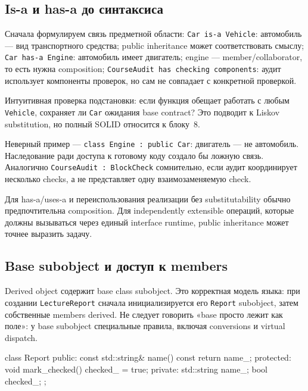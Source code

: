 \subsection{Is-a и has-a до синтаксиса}

Сначала формулируем связь предметной области:
\texttt{Car is-a Vehicle}: автомобиль --- вид транспортного средства; public inheritance может соответствовать смыслу; \texttt{Car has-a Engine}: автомобиль имеет двигатель; engine --- member/collaborator, то есть нужна composition; \texttt{CourseAudit has checking components}: аудит использует компоненты проверок, но сам не совпадает с конкретной проверкой.

Интуитивная проверка подстановки: если функция обещает работать с любым
\texttt{Vehicle}, сохраняет ли \texttt{Car} ожидания base contract? Это
подводит к Liskov substitution, но полный SOLID относится к блоку~8.

Неверный пример --- \texttt{class Engine : public Car}: двигатель --- не автомобиль. Наследование ради доступа к готовому коду создало бы ложную
связь. Аналогично \texttt{CourseAudit : BlockCheck} сомнительно, если аудит
координирует несколько checks, а не представляет одну взаимозаменяемую check.

\begin{whybox}
Для has-a/uses-a и переиспользования реализации без substitutability обычно
предпочтительна composition. Для independently extensible операций, которые
должны вызываться через единый interface runtime, public inheritance может
точнее выразить задачу.
\end{whybox}

\subsection{Base subobject и доступ к members}

Derived object содержит base class subobject. Это корректная модель языка:
при создании \texttt{LectureReport} сначала инициализируется его
\texttt{Report} subobject, затем собственные members derived. Не следует
говорить «base просто лежит как поле»: у base subobject специальные правила,
включая conversions и virtual dispatch.

\begin{cppcode}
class Report {
public:
    const std::string& name() const { return name_; }
protected:
    void mark_checked() { checked_ = true; }
private:
    std::string name_;
    bool checked_{};
};
\end{cppcode}

